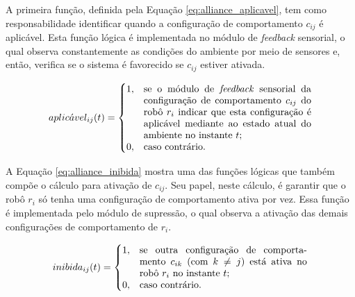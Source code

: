         A primeira função, definida pela Equação \ref{eq:alliance_aplicavel}, tem como responsabilidade identificar quando a configuração de comportamento $c_{ij}$ é aplicável. Esta função lógica é implementada no módulo de \textit{feedback} sensorial, o qual observa constantemente as condições do ambiente por meio de sensores e, então, verifica se o sistema é favorecido se $c_{ij}$ estiver ativada.
        
        \begin{equation} \label{eq:alliance_aplicavel}
            aplic\acute{a}vel_{ij}(t) =
            \begin{cases}
                1, & \parbox[t]{.5\textwidth}{se o módulo de \textit{feedback} sensorial da configuração de comportamento $c_{ij}$ do robô $r_i$ indicar que esta configuração é aplicável mediante ao estado atual do ambiente no instante $t$;} \\
                0, & \text{caso contrário.}
            \end{cases}
        \end{equation}
        
        A Equação \ref{eq:alliance_inibida} mostra uma das funções lógicas que também compõe o cálculo para ativação de $c_{ij}$. Seu papel, neste cálculo, é garantir que o robô $r_i$ só tenha uma configuração de comportamento ativa por vez. Essa função é implementada pelo módulo de supressão, o qual observa a ativação das demais configurações de comportamento de $r_i$. 
        
        \begin{equation} \label{eq:alliance_inibida}
            inibida_{ij}(t) =
            \begin{cases}
                1, & \parbox[t]{.5\textwidth}{se outra configuração de comportamento $c_{ik}$ (com $k \neq j$) está ativa no robô $r_i$ no instante $t$;} \\
                0, & \text{caso contrário.}
            \end{cases}
        \end{equation}
        

